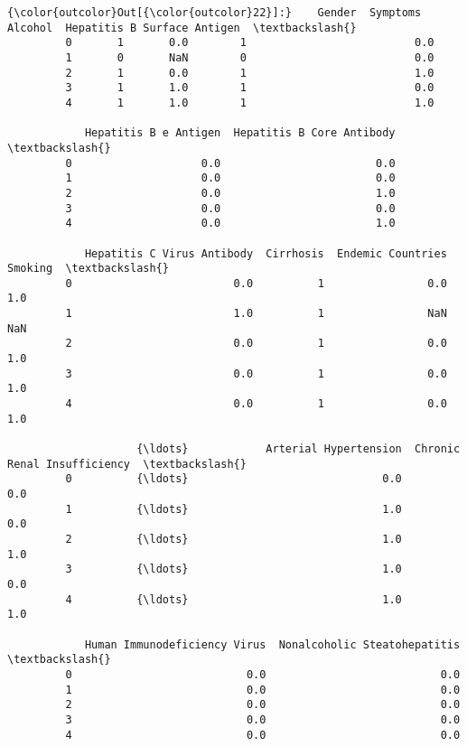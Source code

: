 \documentclass[11pt]{article}
\begin{document}
\begin{Verbatim}[commandchars=\\\{\}]
{\color{outcolor}Out[{\color{outcolor}22}]:}    Gender  Symptoms  Alcohol  Hepatitis B Surface Antigen  \textbackslash{}
         0       1       0.0        1                          0.0   
         1       0       NaN        0                          0.0   
         2       1       0.0        1                          1.0   
         3       1       1.0        1                          0.0   
         4       1       1.0        1                          1.0   
         
            Hepatitis B e Antigen  Hepatitis B Core Antibody  \textbackslash{}
         0                    0.0                        0.0   
         1                    0.0                        0.0   
         2                    0.0                        1.0   
         3                    0.0                        0.0   
         4                    0.0                        1.0   
         
            Hepatitis C Virus Antibody  Cirrhosis  Endemic Countries  Smoking  \textbackslash{}
         0                         0.0          1                0.0      1.0   
         1                         1.0          1                NaN      NaN   
         2                         0.0          1                0.0      1.0   
         3                         0.0          1                0.0      1.0   
         4                         0.0          1                0.0      1.0   
         
                    {\ldots}            Arterial Hypertension  Chronic Renal Insufficiency  \textbackslash{}
         0          {\ldots}                              0.0                          0.0   
         1          {\ldots}                              1.0                          0.0   
         2          {\ldots}                              1.0                          1.0   
         3          {\ldots}                              1.0                          0.0   
         4          {\ldots}                              1.0                          1.0   
         
            Human Immunodeficiency Virus  Nonalcoholic Steatohepatitis  \textbackslash{}
         0                           0.0                           0.0   
         1                           0.0                           0.0   
         2                           0.0                           0.0   
         3                           0.0                           0.0   
         4                           0.0                           0.0   
         

\end{Verbatim}
\end{document}
